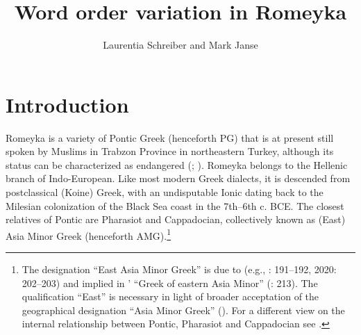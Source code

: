 \documentclass[output=paper,colorlinks,citecolor=brown]{langscibook}
\author{Laurentia Schreiber\orcid{0000-0002-0051-1164}\affiliation{University of Bamberg} and Mark Janse\orcid{0000-0002-2824-3894}\affiliation{University of Cambridge}}
\title{Word order variation in Romeyka}
\begin{document}
\maketitle\label{WOWA:ch:12}

\section{Introduction}\label{Romeyka:ss:1}

Romeyka is a variety of Pontic Greek (henceforth PG) that is at present still spoken by Muslims in Trabzon Province in northeastern Turkey, although its status can be characterized as endangered (\citealt{schreiber2016assessing}; \citealt{schreiberSitaridou2017assessing}). Romeyka belongs to the Hellenic branch of Indo-European. Like most modern Greek dialects, it is descended from postclassical (Koine) Greek, with an undisputable Ionic  dating back to the Milesian colonization of the Black Sea coast in the 7th--6th c. BCE. The closest relatives of Pontic are Pharasiot  and Cappadocian, collectively known as (East) Asia Minor Greek (henceforth AMG).\footnote{The designation ``East Asia Minor Greek'' is due to \citeauthor{janseClitic2008} (e.g., \citeyear{janseClitic2008}: 191--192, \citeyear{janseBack2020}2020: 202--203) and implied in \citeauthor{dawkins1916}' ``Greek of eastern Asia Minor'' (\citeyear{dawkins1916}: 213). The qualification ``East'' is necessary in light of  broader acceptation of the geographical designation ``Asia Minor Greek'' (\citealt{ralli2020selected}). For a different view on the internal relationship between Pontic, Pharasiot  and Cappadocian see \citet[40--55]{karatsareas2016asia}.} 
\end{document}
